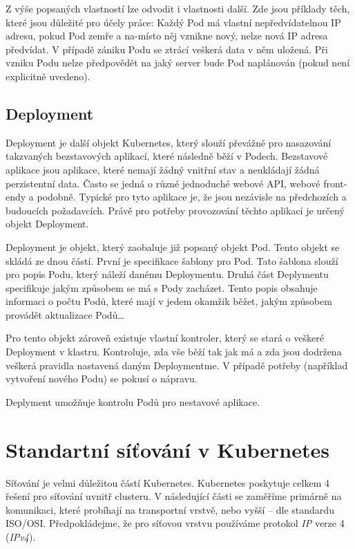 Z výše popsaných vlastností lze odvodit i vlastnosti další. Zde jsou příklady těch, které jsou důležité pro účely práce: Každý Pod má vlastní nepředvídatelnou IP adresu, pokud Pod zemře a na-místo něj vznikne nový, nelze nová IP adresa předvídat. V případě zániku Podu se ztrácí veškerá data v něm uložená. Při vzniku Podu nelze předpovědět na jaký server bude Pod naplánován (pokud není explicitně uvedeno). 

\subsection{Deployment}
Deployment je další objekt Kubernetes, který slouží převážně pro nasazování takzvaných bezstavových aplikací, které následně běží v Podech. Bezstavové aplikace jsou aplikace, které nemají žádný vnitřní stav a neukládají žádná perzistentní data. Často se jedná o různé jednoduché webové API, webové front-endy a podobně. Typické pro tyto aplikace je, že jsou nezávisle na předchozích a budoucích požadavcích. Právě pro potřeby provozování těchto aplikací je určený objekt Deployment.

Deployment je objekt, který zaobaluje již popsaný objekt Pod. Tento objekt se skládá ze dnou částí. První je specifikace šablony pro Pod. Tato šablona slouží pro popis Podu, který náleží danému Deploymentu. Druhá část Deplymentu specifikuje jakým způsobem se má s Pody zacházet. Tento popis obsahuje informaci o počtu Podů, které mají v jedem okamžik běžet, jakým způsobem provádět aktualizace Podů\ldots

Pro tento objekt zároveň existuje vlastní kontroler, který se stará o veškeré Deployment v klastru. Kontroluje, zda vše běží tak jak má a zda jsou dodržena veškerá pravidla nastavená daným Deploymentme. V případě potřeby (například vytvoření nového Podu) se pokusí o nápravu. \cite{poulton_2022_the}

Deplyment umožňuje kontrolu Podů pro nestavové aplikace.
\section{Standartní síťování v Kubernetes}
Síťování je velmi důležitou částí Kubernetes. Kubernetes poskytuje celkem 4 řešení pro síťování uvnitř clusteru. V následující části se zaměříme primárně na komunikaci, které probíhají na transportní vrstvě, nebo vyšší -- dle standardu ISO/OSI. Předpokládejme, že pro síťovou vrstvu používáme protokol \textit{IP} verze 4 (\textit{IPv4}).

